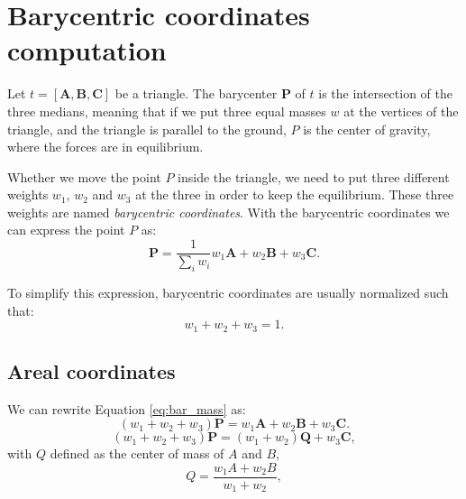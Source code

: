 
\chapter{Barycentric coordinates computation}
\label{app:barycentric_}

Let $\mathit{t} = [\mathbf{A}, \mathbf{B}, \mathbf{C}]$ be a triangle. 
The barycenter $\mathbf{P}$ of $t$ is the intersection of the three medians, meaning that if we put three equal masses $w$ at the vertices of the triangle, and the triangle is parallel to the ground, $P$ is the center of gravity, where the forces are in equilibrium.

Whether we move the point $P$ inside the triangle, we need to put three different weights $w_1$, $w_2$ and $w_3$ at the three in order to keep the equilibrium. 
These three weights are named \emph{barycentric coordinates}.
With the barycentric coordinates we can express the point $P$ as:
\begin{equation}
\label{eq:bar_mass}
 \mathbf{P} = \frac{1}{\sum_i w_i}  w_1 \mathbf{A} + w_2 \mathbf{B} + w_3 \mathbf{C}.
\end{equation}

To simplify this expression, barycentric coordinates are usually normalized such that:
\begin{equation}
  w_1 + w_2 + w_3 = 1.
\end{equation}

\section{Areal coordinates}
We can rewrite Equation \eqref{eq:bar_mass} as:
\begin{equation}
\label{eq:bar_mass2}
 (w_1 + w_2 + w_3) \mathbf{P} =  w_1 \mathbf{A} + w_2 \mathbf{B} + w_3 \mathbf{C}.
\end{equation}
\begin{equation}
\label{eq:bar_mass2}
 (w_1 + w_2 + w_3) \mathbf{P} =  (w_1  + w_2) \mathbf{Q} + w_3 \mathbf{C},
\end{equation}
with $Q$ defined as the center of mass of $A$ and $B$,
\begin{equation}
 Q = \frac{w_1 A + w_2 B}{w_1 + w_2},
\end{equation}

